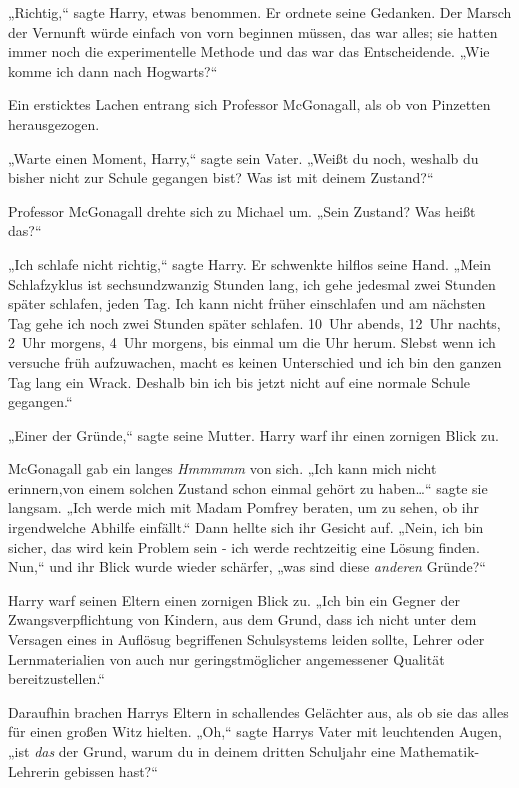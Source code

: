 {„Richtig,“ sagte Harry, etwas benommen. Er ordnete seine Gedanken. Der Marsch der Vernunft würde einfach von vorn beginnen müssen, das war alles; sie hatten immer noch die experimentelle Methode und das war das Entscheidende. „Wie komme ich dann nach Hogwarts?“

Ein ersticktes Lachen entrang sich Professor McGonagall, als ob von Pinzetten herausgezogen.

„Warte einen Moment, Harry,“ sagte sein Vater. „Weißt du noch, weshalb du bisher nicht zur Schule gegangen bist? Was ist mit deinem Zustand?“

Professor McGonagall drehte sich zu Michael um. „Sein Zustand? Was heißt das?“

„Ich schlafe nicht richtig,“ sagte Harry. Er schwenkte hilflos seine Hand. „Mein Schlafzyklus ist sechsundzwanzig Stunden lang, ich gehe jedesmal zwei Stunden später schlafen, jeden Tag. Ich kann nicht früher einschlafen und am nächsten Tag gehe ich noch zwei Stunden später schlafen. 10~Uhr abends, 12~Uhr nachts, 2~Uhr morgens, 4~Uhr morgens, bis einmal um die Uhr herum. Slebst wenn ich versuche früh aufzuwachen, macht es keinen Unterschied und ich bin den ganzen Tag lang ein Wrack. Deshalb bin ich bis jetzt nicht auf eine normale Schule gegangen.“

„Einer der Gründe,“ sagte seine Mutter. Harry warf ihr einen zornigen Blick zu.

McGonagall gab ein langes \emph{Hmmmmm} von sich. „Ich kann mich nicht erinnern,von einem solchen Zustand schon einmal gehört zu haben…“ sagte sie langsam. „Ich werde mich mit Madam Pomfrey beraten, um zu sehen, ob ihr irgendwelche Abhilfe einfällt.“ Dann hellte sich ihr Gesicht auf. „Nein, ich bin sicher, das wird kein Problem sein - ich werde rechtzeitig eine Lösung finden. Nun,“ und ihr Blick wurde wieder schärfer, „was sind diese \emph{anderen} Gründe?“

Harry warf seinen Eltern einen zornigen Blick zu. „Ich bin ein Gegner der Zwangsverpflichtung von Kindern, aus dem Grund, dass ich nicht unter dem Versagen eines in Auflösug begriffenen Schulsystems leiden sollte, Lehrer oder Lernmaterialien von auch nur geringstmöglicher angemessener Qualität bereitzustellen.“

Daraufhin brachen Harrys Eltern in schallendes Gelächter aus, als ob sie das alles für einen großen Witz hielten. „Oh,“ sagte Harrys Vater mit leuchtenden Augen, „ist \emph{das} der Grund, warum du in deinem dritten Schuljahr eine Mathematik-Lehrerin gebissen hast?“

}
